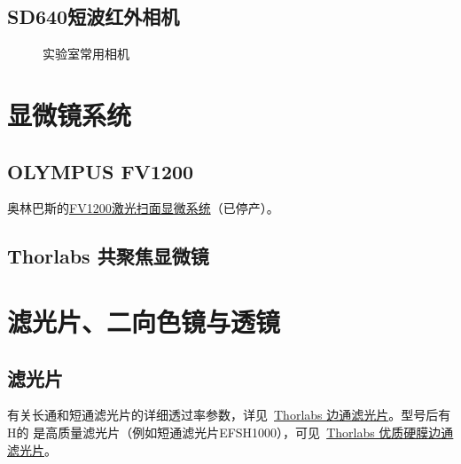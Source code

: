 \documentclass[cn,11pt,chinese]{elegantbook}
\begin{document}
\subsection{SD640短波红外相机}

\begin{figure}[ht]
	\centering
	 \quad
	 \quad
	\caption{实验室常用相机} 
	\label{fig:camera}
\end{figure}
\section{显微镜系统}
\subsection{OLYMPUS FV1200}
奥林巴斯的\href{https://www.olympus-lifescience.com.cn/zh/laser-scanning/fv1200}{FV1200激光扫面显微系统}（已停产）。

\subsection{Thorlabs 共聚焦显微镜}

\section{滤光片、二向色镜与透镜}
\subsection{滤光片}
有关长通和短通滤光片的详细透过率参数，详见~\href{https://www.thorlabschina.cn/newgrouppage9.cfm?objectgroup_id=918}{Thorlabs 边通滤光片}。型号后有H的
是高质量滤光片（例如短通滤光片EFSH1000），可见~\href{https://www.thorlabschina.cn/newgrouppage9.cfm?objectgroup_id=6082}{Thorlabs 优质硬膜边通滤光片}。
\end{document}
